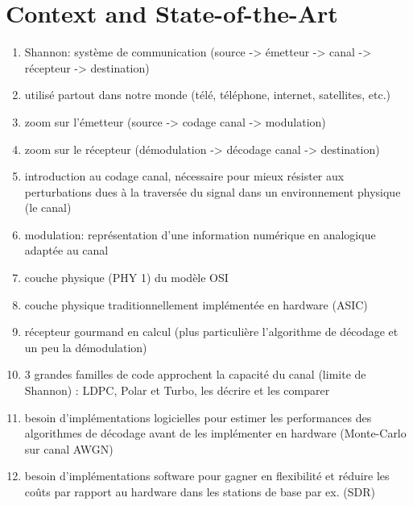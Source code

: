 \chapter{Context and State-of-the-Art}

\begin{enumerate}
  \item Shannon: système de communication (source -> émetteur -> canal ->
        récepteur -> destination)
  \item utilisé partout dans notre monde (télé, téléphone, internet, satellites,
        etc.)
  \item zoom sur l'émetteur (source -> codage canal -> modulation)
  \item zoom sur le récepteur (démodulation -> décodage canal -> destination)
  \item introduction au codage canal, nécessaire pour mieux résister aux
        perturbations dues à la traversée du signal dans un environnement
        physique (le canal)
  \item modulation: représentation d'une information numérique en analogique
        adaptée au canal
  \item couche physique (PHY 1) du modèle OSI
  \item couche physique traditionnellement implémentée en hardware (ASIC)
  \item récepteur gourmand en calcul (plus particulière l'algorithme de décodage
        et un peu la démodulation)
  \item 3 grandes familles de code approchent la capacité du canal (limite de
        Shannon) : LDPC, Polar et Turbo, les décrire et les comparer
  \item besoin d'implémentations logicielles pour estimer les performances des
        algorithmes de décodage avant de les implémenter en hardware
        (Monte-Carlo sur canal AWGN)
  \item besoin d'implémentations software pour gagner en flexibilité et réduire
        les coûts par rapport au hardware dans les stations de base par ex.
        (SDR)
\end{enumerate}